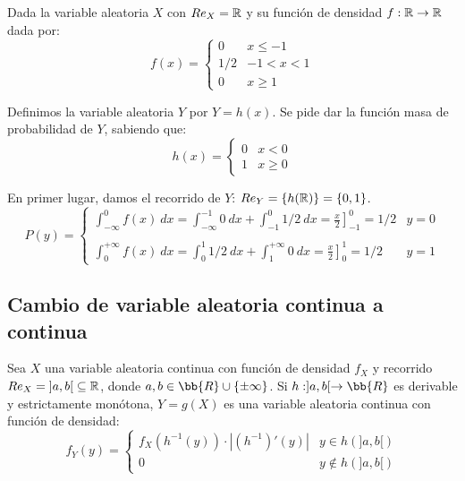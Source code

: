 \begin{ejemplo}
    Dada la variable aleatoria $X$ con $Re_X=\mathbb R$ y su función de densidad $f:\mathbb R \rightarrow \mathbb R$ dada por:
    $$f(x) = \left\{ \begin{array}{ll}
        0   & x \leq -1  \\
        1/2 & -1 < x < 1 \\
        0   & x \geq 1
    \end{array} \right.$$
    
    
    Definimos la variable aleatoria $Y$ por $Y=h(x)$. Se pide dar la función masa de probabilidad de $Y$, sabiendo que:
    $$h(x) = \left\{ \begin{array}{ll}
        0 & x < 0    \\
        1 & x \geq 0
    \end{array} \right.$$
    
    En primer lugar, damos el recorrido de $Y$: $Re_Y = \{h(\mathbb R)\} = \{0,1\}$.
    $$P(y) = \left\{ \begin{array}{ll}
        \displaystyle \int_{-\infty}^0 f(x)~dx = \int_{-\infty}^{-1} 0~dx + \int_{-1}^0 1/2~dx = \left.\frac{x}{2}\right]_{-1}^0 = 1/2 & y=0   \\ \\
        \displaystyle \int_0^{+\infty} f(x)~dx = \int_0^1 1/2~dx + \int_1^{+\infty} 0~dx = \left.\frac{x}{2}\right]_0^1 = 1/2          & y = 1
      \end{array} \right.$$
\end{ejemplo}

\subsection{Cambio de variable aleatoria continua a continua}
\label{subsec:CV_Continua}

\begin{coro}
    Sea $X$ una variable aleatoria continua con función de densidad $f_X$ y recorrido $Re_X=\left]a,b\right[\subseteq \mathbb R$, donde $a,b\in \bb{R}\cup \{\pm \infty\}$.
    Si $h:]a,b[\to \bb{R}$ es derivable y estrictamente monótona, $Y=g(X)$ es una variable aleatoria continua con función de densidad:
    \begin{equation*}
        f_Y(y)=\begin{cases}
            f_X(h^{-1}(y))\cdot |(h^{-1})'(y)| & y \in h(]a,b[)\\
            0 & y \notin h(]a,b[)
        \end{cases}
    \end{equation*}
\end{coro}

